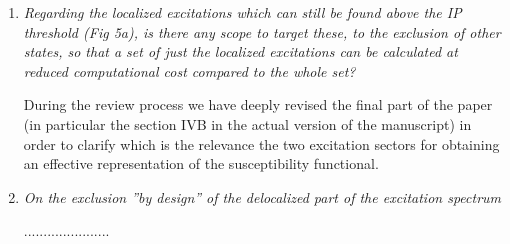 \documentclass[11pt,a4paper]{article}
\newcommand{\op}[1]{\hat {#1}}
\begin{document}
\begin{enumerate}
 
\item \emph{Regarding the localized excitations which can still be found above the IP threshold (Fig 5a), is there any scope to target these, to the
exclusion of other states, so that a set of just the localized excitations can be calculated at reduced computational cost compared to the whole set?}

 During the review process we have deeply revised the final part of the paper (in particular the section IVB in the actual version of the manuscript) in order to clarify which is the relevance the two excitation sectors for obtaining an effective representation of the susceptibility functional.
  

 \item \emph{On the exclusion ''by design'' of the delocalized part of the excitation spectrum}
 
 ......................
 
%  
%  
%  
%  
%  
% 
%  
%  
% 
%  
%  
%  
%  
 
 
\end{enumerate}




\end{document}
